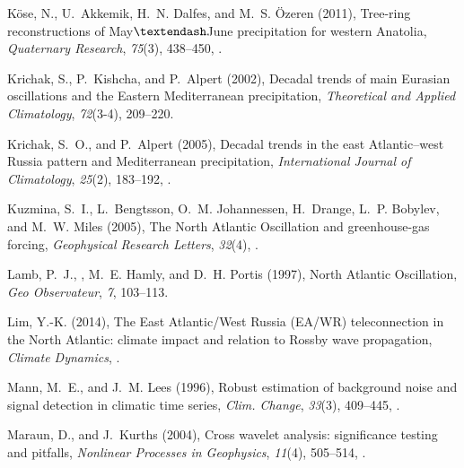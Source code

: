 \documentclass[draft,jgr]{AGUTeX}
\begin{document}
\begin{article}
\begin{thebibliography}{74}
K\"ose, N., U.~Akkemik, H.~N. Dalfes, and M.~S. \"Ozeren (2011), {Tree-ring
  reconstructions of May$\textendash$June precipitation for western Anatolia},
  \textit{Quaternary Research}, \textit{75}(3), 438--450,
  .

Krichak, S., P.~Kishcha, and P.~Alpert (2002), {Decadal trends of main Eurasian
  oscillations and the Eastern Mediterranean precipitation},
  \textit{Theoretical and Applied Climatology}, \textit{72}(3-4), 209--220.

Krichak, S.~O., and P.~Alpert (2005), {Decadal trends in the east
  Atlantic--west Russia pattern and Mediterranean precipitation},
  \textit{International Journal of Climatology}, \textit{25}(2), 183--192,
  .

Kuzmina, S.~I., L.~Bengtsson, O.~M. Johannessen, H.~Drange, L.~P. Bobylev, and
  M.~W. Miles (2005), {The North Atlantic Oscillation and greenhouse-gas
  forcing}, \textit{Geophysical Research Letters}, \textit{32}(4),
  .

Lamb, P.~J., , M.~E. Hamly, and D.~H. Portis (1997), {North Atlantic
  Oscillation}, \textit{Geo Observateur}, \textit{7}, 103--113.

Lim, Y.-K. (2014), {The East Atlantic/West Russia ({EA}/{WR}) teleconnection in
  the North Atlantic: climate impact and relation to Rossby wave propagation},
  \textit{Climate Dynamics}, .

Mann, M.~E., and J.~M. Lees (1996), {Robust estimation of background noise and
  signal detection in climatic time series}, \textit{Clim. Change},
  \textit{33}(3), 409--445, .

Maraun, D., and J.~Kurths (2004), Cross wavelet analysis: significance testing
  and pitfalls, \textit{Nonlinear Processes in Geophysics}, \textit{11}(4),
  505--514, .


\end{thebibliography}
\end{article}
\end{document}
